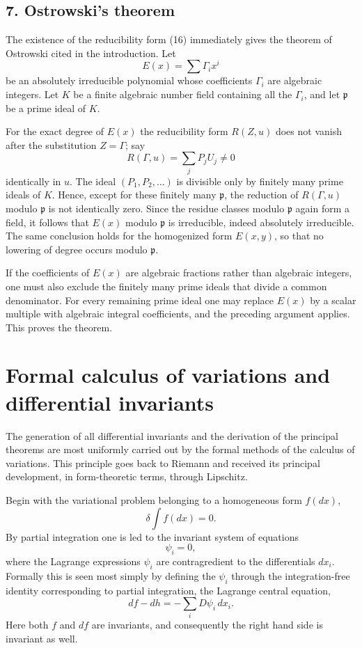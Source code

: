\documentclass[11pt]{article}
\begin{document}
\subsection*{7. Ostrowski's theorem}

The existence of the reducibility form (16) immediately gives the theorem of Ostrowski cited in the introduction. Let
\[
  E(x)=\sum \Gamma_i x^i
\]
be an absolutely irreducible polynomial whose coefficients $\Gamma_i$ are algebraic integers. Let $K$ be a finite algebraic number field containing all the $\Gamma_i$, and let $\mathfrak p$ be a prime ideal of $K$.

For the exact degree of $E(x)$ the reducibility form $R(Z,u)$ does not vanish after the substitution $Z=\Gamma$; say
\[
  R(\Gamma,u)=\sum_j P_j U_j\ne 0
\]
identically in $u$. The ideal $(P_1,P_2,\ldots)$ is divisible only by finitely many prime ideals of $K$. Hence, except for these finitely many $\mathfrak p$, the reduction of $R(\Gamma,u)$ modulo $\mathfrak p$ is not identically zero. Since the residue classes modulo $\mathfrak p$ again form a field, it follows that $E(x)$ modulo $\mathfrak p$ is irreducible, indeed absolutely irreducible. The same conclusion holds for the homogenized form $E(x,y)$, so that no lowering of degree occurs modulo $\mathfrak p$.

If the coefficients of $E(x)$ are algebraic fractions rather than algebraic integers, one must also exclude the finitely many prime ideals that divide a common denominator. For every remaining prime ideal one may replace $E(x)$ by a scalar multiple with algebraic integral coefficients, and the preceding argument applies. This proves the theorem.

\section{Formal calculus of variations and differential invariants}

The generation of all differential invariants and the derivation of the principal theorems are most uniformly carried out by the formal methods of the calculus of variations. This principle goes back to Riemann and received its principal development, in form-theoretic terms, through Lipschitz.

Begin with the variational problem belonging to a homogeneous form $f(dx)$,
\begin{equation}
  \delta \int f(dx)=0.                                            \tag{140}
\end{equation}
By partial integration one is led to the invariant system of equations
\[
  \psi_i=0,
\]
where the Lagrange expressions $\psi_i$ are contragredient to the differentials $dx_i$. Formally this is seen most simply by defining the $\psi_i$ through the integration-free identity corresponding to partial integration, the Lagrange central equation,
\[
  df-dh=-\sum_i D\psi_i\,dx_i.
\]
Here both $f$ and $df$ are invariants, and consequently the right hand side is invariant as well.
\end{document}
